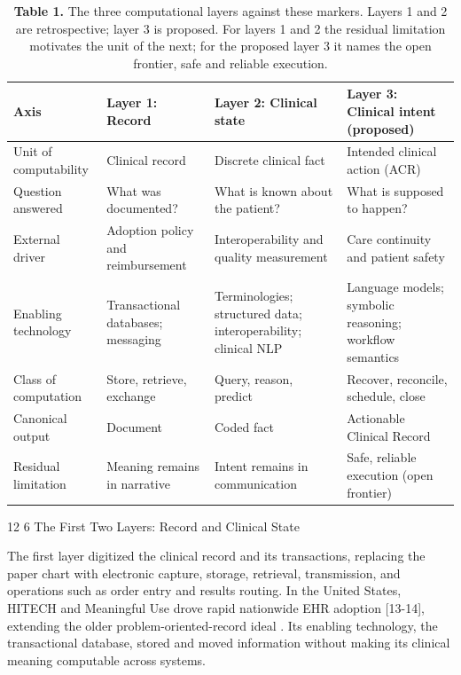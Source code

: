 \documentclass[3p,twocolumn]{elsarticle}
\makeatletter
\renewcommand\section{\@startsection{section}{1}{\z@}%
           {12\p@ \@plus 4\p@ \@minus 4\p@}%
           {6\p@ \@plus 4\p@ \@minus 3\p@}%
           {\normalsize\bfseries\boldmath}}
\makeatother
\begin{document}
\begin{table}[t]
\centering
\caption{\textbf{Table 1.} The three computational layers against these markers. Layers 1 and 2 are retrospective; layer 3 is proposed. For layers 1 and 2 the residual limitation motivates the unit of the next; for the proposed layer 3 it names the open frontier, safe and reliable execution.}
\small\setlength{\tabcolsep}{4pt}%
\setlength{\tabcolsep}{4pt}
\begin{tabularx}{\textwidth}{>{\hsize=0.653\hsize\raggedright\arraybackslash}X >{\hsize=0.881\hsize\raggedright\arraybackslash}X >{\hsize=1.279\hsize\raggedright\arraybackslash}X >{\hsize=1.187\hsize\raggedright\arraybackslash}X}
\toprule
Axis & Layer 1: Record & Layer 2: Clinical state & Layer 3: Clinical intent (proposed) \\
\midrule
Unit of computability & Clinical record & Discrete clinical fact & Intended clinical action (ACR) \\
Question answered & What was documented? & What is known about the patient? & What is supposed to happen? \\
External driver & Adoption policy and reimbursement & Interoperability and quality measurement & Care continuity and patient safety \\
Enabling technology & Transactional databases; messaging & Terminologies; structured data; interoperability; clinical NLP & Language models; symbolic reasoning; workflow semantics \\
Class of computation & Store, retrieve, exchange & Query, reason, predict & Recover, reconcile, schedule, close \\
Canonical output & Document & Coded fact & Actionable Clinical Record \\
Residual limitation & Meaning remains in narrative & Intent remains in communication & Safe, reliable execution (open frontier) \\
\bottomrule
\end{tabularx}
\end{table}

\section{The First Two Layers: Record and Clinical State}\label{the-first-two-layers-record-and-clinical-state}

The first layer digitized the clinical record and its transactions, replacing the paper chart with electronic capture, storage, retrieval, transmission, and operations such as order entry and results routing. In the United States, HITECH and Meaningful Use drove rapid nationwide EHR adoption {[}13-14{]}, extending the older problem-oriented-record ideal \cite{ref15}. Its enabling technology, the transactional database, stored and moved information without making its clinical meaning computable across systems.
\end{document}

